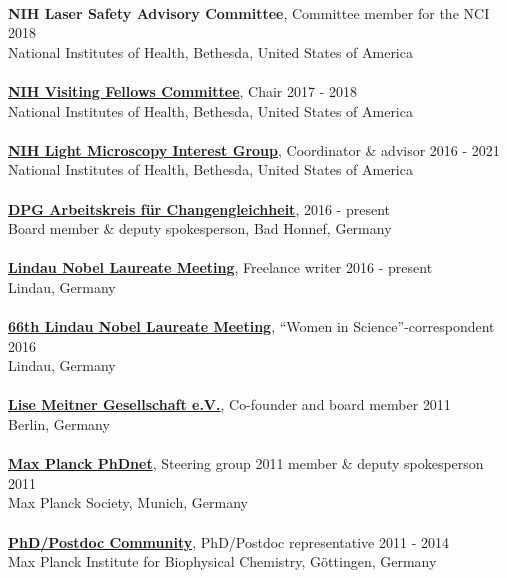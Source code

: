 \documentclass[margin,line]{res}
\begin{document}
\begin{resume}
\vspace*{-3mm}\\
{\bf NIH Laser Safety Advisory Committee}, Committee member for the NCI \hfill {2018}\\
National Institutes of Health, Bethesda, United States of America\\
\vspace*{-3mm}\\
{\bf \href{https://www.training.nih.gov/felcom/visitingfellows2}{NIH Visiting Fellows Committee}}, Chair \hfill {2017 - 2018}\\
National Institutes of Health, Bethesda, United States of America\\
\vspace*{-3mm}\\
{\bf \href{https://confocal.ccr.cancer.gov/light-microscopy-interest-group/}{NIH Light Microscopy Interest Group}}, Coordinator \& advisor  \hfill {2016 - 2021}\\
National Institutes of Health, Bethesda, United States of America\\
\vspace*{-3mm}\\
{\bf  \href{https://www.dpg-physik.de/vereinigungen/fachuebergreifend/ak/akc}{DPG Arbeitskreis für Changengleichheit}}, \hfill {2016 - present}\\
Board member \& deputy spokesperson, Bad Honnef, Germany\\
\vspace*{-3mm}\\
{\bf \href{https://www.lindau-nobel.org/blog-women-in-research-at-lino70/}{Lindau Nobel Laureate Meeting}}, Freelance writer \hfill {2016 - present}\\
Lindau, Germany\\
\vspace*{-3mm}\\
{\bf \href{https://www.br.de/fernsehen/ard-alpha/sendungen/alpha-forum/alpha-forum-extra-spitzenforschung-102.html}{66th Lindau Nobel Laureate Meeting}}, “Women in Science”-correspondent \hfill {2016}\\
Lindau, Germany\\
\vspace*{-3mm}\\
{\bf \href{https://www.lise-meitner-gesellschaft.org/}{Lise Meitner Gesellschaft e.V.}}, Co-founder and board member \hfill {2011}\\
Berlin, Germany\\
\vspace*{-3mm}\\
{\bf \href{https://www.phdnet.mpg.de/home}{Max Planck PhDnet}}, Steering group 2011 member \& deputy spokesperson \hfill {2011}\\
Max Planck Society, Munich, Germany\\
\vspace*{-3mm}\\
{\bf  \href{https://www.mpibpc.mpg.de/phdcom}{PhD/Postdoc Community}}, PhD/Postdoc representative \hfill {2011 - 2014}\\
Max Planck Institute for Biophysical Chemistry, Göttingen, Germany


\end{resume}
\end{document}
